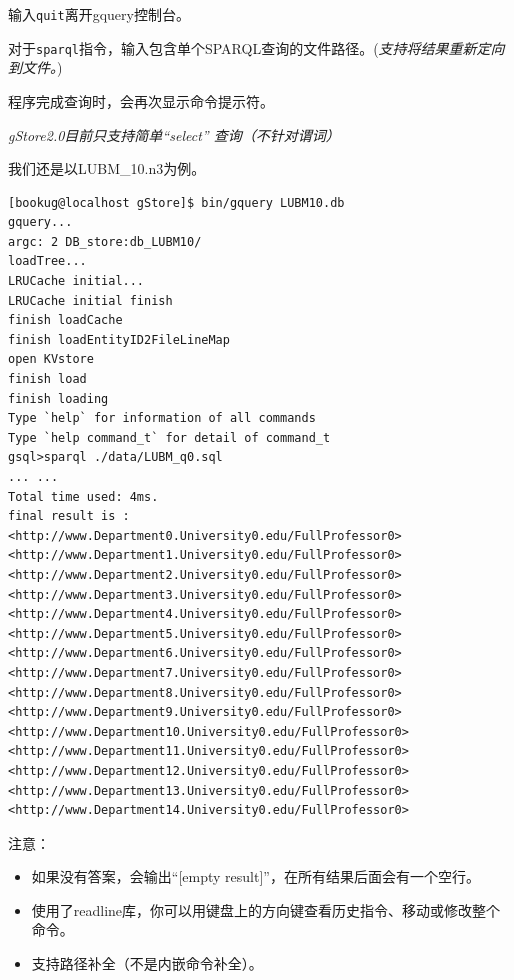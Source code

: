 \documentclass[titlepage, a4paper, 12pt]{article}
\begin{document}
输入\texttt{quit}离开gquery控制台。

对于\texttt{sparql}指令，输入包含单个SPARQL查询的文件路径。(\emph{支持将结果重新定向到文件。})

程序完成查询时，会再次显示命令提示符。

\emph{gStore2.0目前只支持简单``select'' 查询（不针对谓词）}

我们还是以LUBM\_10.n3为例。

\begin{verbatim}
[bookug@localhost gStore]$ bin/gquery LUBM10.db
gquery...
argc: 2 DB_store:db_LUBM10/
loadTree...
LRUCache initial...
LRUCache initial finish
finish loadCache
finish loadEntityID2FileLineMap
open KVstore
finish load
finish loading
Type `help` for information of all commands
Type `help command_t` for detail of command_t
gsql>sparql ./data/LUBM_q0.sql
... ...
Total time used: 4ms.
final result is :
<http://www.Department0.University0.edu/FullProfessor0>
<http://www.Department1.University0.edu/FullProfessor0>
<http://www.Department2.University0.edu/FullProfessor0>
<http://www.Department3.University0.edu/FullProfessor0>
<http://www.Department4.University0.edu/FullProfessor0>
<http://www.Department5.University0.edu/FullProfessor0>
<http://www.Department6.University0.edu/FullProfessor0>
<http://www.Department7.University0.edu/FullProfessor0>
<http://www.Department8.University0.edu/FullProfessor0>
<http://www.Department9.University0.edu/FullProfessor0>
<http://www.Department10.University0.edu/FullProfessor0>
<http://www.Department11.University0.edu/FullProfessor0>
<http://www.Department12.University0.edu/FullProfessor0>
<http://www.Department13.University0.edu/FullProfessor0>
<http://www.Department14.University0.edu/FullProfessor0>
\end{verbatim}

注意：

\begin{itemize}
	\item
	如果没有答案，会输出``{[}empty result{]}''，在所有结果后面会有一个空行。
	\item
	使用了readline库，你可以用键盘上的方向键查看历史指令、移动或修改整个命令。
	\item
	支持路径补全（不是内嵌命令补全）。
\end{itemize}

\end{document}
